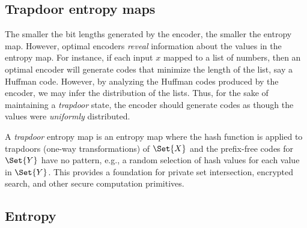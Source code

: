 \documentclass[ ../main.tex]{subfiles}
\begin{document}
\subsection{Trapdoor entropy maps}
\label{sec:trapdoor}

The smaller the bit lengths generated by the encoder, the smaller the entropy map.
However, optimal encoders \emph{reveal} information about the values in the entropy map.
For instance, if each input $x$ mapped to a list of numbers, then an optimal encoder will generate codes that minimize the length of the list, say a Huffman code.
However, by analyzing the Huffman codes produced by the encoder, we may infer the distribution of the lists.
Thus, for the sake of maintaining a \emph{trapdoor} state, the encoder should generate codes as though the values were \emph{uniformly} distributed.

A \emph{trapdoor} entropy map is an entropy map where the hash function is
applied to trapdoors (one-way transformations) of $\Set{X}$ and the
prefix-free codes for $\Set{Y}$ have no pattern, e.g., a
random selection of hash values for each value in $\Set{Y}$. This
provides a foundation for private set intersection, encrypted search, and
other secure computation primitives.

\subsection{Entropy}
\label{sec:entropy-map-entropy}

\end{document}
